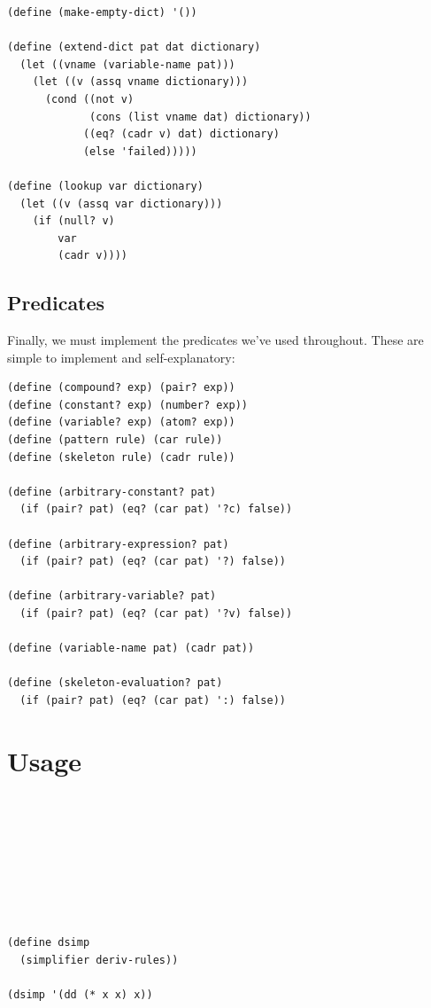 \documentclass[9pt]{report}
\begin{document}
\begin{verbatim}
(define (make-empty-dict) '())

(define (extend-dict pat dat dictionary)
  (let ((vname (variable-name pat)))
    (let ((v (assq vname dictionary)))
      (cond ((not v)
             (cons (list vname dat) dictionary))
            ((eq? (cadr v) dat) dictionary)
            (else 'failed)))))

(define (lookup var dictionary)
  (let ((v (assq var dictionary)))
    (if (null? v)
        var
        (cadr v))))
\end{verbatim}

\subsection{Predicates}
\label{sec:org2d17e2c}
Finally, we must implement the predicates we've used throughout.
These are simple to implement and self-explanatory:

\begin{verbatim}
(define (compound? exp) (pair? exp))
(define (constant? exp) (number? exp))
(define (variable? exp) (atom? exp))
(define (pattern rule) (car rule))
(define (skeleton rule) (cadr rule))

(define (arbitrary-constant? pat)
  (if (pair? pat) (eq? (car pat) '?c) false))

(define (arbitrary-expression? pat)
  (if (pair? pat) (eq? (car pat) '?) false))

(define (arbitrary-variable? pat)
  (if (pair? pat) (eq? (car pat) '?v) false))

(define (variable-name pat) (cadr pat))

(define (skeleton-evaluation? pat)
  (if (pair? pat) (eq? (car pat) ':) false))
\end{verbatim}

\section{Usage}
\label{sec:org952613c}

\begin{verbatim}








(define dsimp
  (simplifier deriv-rules))

(dsimp '(dd (* x x) x))
\end{verbatim}
\end{document}
